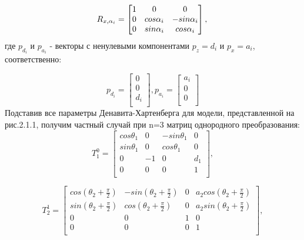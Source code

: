 \begin{equation*}\label{eq:model}
R_{x, \alpha_i} = 
     \begin{bmatrix}
    1 & 0 & 0\\
    0 & cos\alpha_i & -sin\alpha_i\\
    0 & sin\alpha_i & cos\alpha_i\\
    \end{bmatrix}
    , \\
\end{equation*} 
\hspace*{\parindent}где  $p_{d_i}$ и $p_{a_i}$ - векторы с ненулевыми компонентами $p_z= d_i$ и $p_x= a_i$, соответственно:

\begin{equation*}\label{eq:model}
 p_{d_i} = 
     \begin{bmatrix}
   0\\
   0\\
   d_i\\
    \end{bmatrix}
, p_{a_i} =
     \begin{bmatrix}
   a_i\\
   0\\
   0\\
    \end{bmatrix}
\end{equation*}
\hspace*{\parindent}Подставив все параметры Денавита-Хартенберга для модели, представленной на рис.2.1.1, получим частный случай при n=3 матриц однородного преобразования:\\

\begin{equation*}\label{eq:model}
T_1^0 = 
     \begin{bmatrix}
    cos{\theta_1} & 0 &  -sin{\theta_1} & 0 \\
    sin{\theta_1} & 0 &  cos{\theta_1} & 0 \\
    0 & -1 & 0 & d_1\\
    0 & 0 & 0 & 1\\
    \end{bmatrix}
    ,
\end{equation*} 

\begin{equation*}\label{eq:model}
T_2^1 = 
     \begin{bmatrix}
    cos{(\theta_2 + \frac{\pi}{2})} & -sin{(\theta_2 + \frac{\pi}{2})} & 0 & a_2 cos{(\theta_2 + \frac{\pi}{2})} \\
    sin{(\theta_2 + \frac{\pi}{2})} & cos{(\theta_2 + \frac{\pi}{2})} & 0 & a_2 sin{(\theta_2 + \frac{\pi}{2})}\\
    0 & 0 & 1 & 0\\
    0 & 0 & 0 & 1\\
    \end{bmatrix}
    ,
\end{equation*} 

